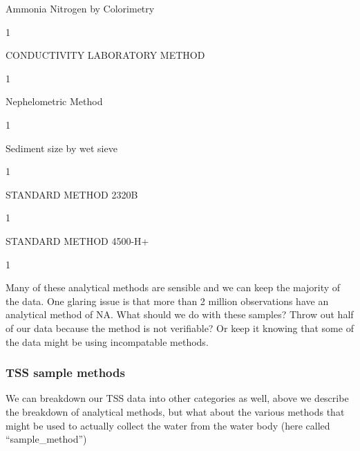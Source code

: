 \documentclass[]{article}
\newenvironment{Shaded}{\begin{snugshade}}{\end{snugshade}}
\newcommand{\DataTypeTok}[1]{\textcolor[rgb]{0.13,0.29,0.53}{#1}}
\newcommand{\KeywordTok}[1]{\textcolor[rgb]{0.13,0.29,0.53}{\textbf{#1}}}
\newcommand{\NormalTok}[1]{#1}
\newcommand{\OperatorTok}[1]{\textcolor[rgb]{0.81,0.36,0.00}{\textbf{#1}}}
\newcommand{\StringTok}[1]{\textcolor[rgb]{0.31,0.60,0.02}{#1}}
\begin{document}
Ammonia Nitrogen by Colorimetry

1

CONDUCTIVITY LABORATORY METHOD

1

Nephelometric Method

1

Sediment size by wet sieve

1

STANDARD METHOD 2320B

1

STANDARD METHOD 4500-H+

1

Many of these analytical methods are sensible and we can keep the
majority of the data. One glaring issue is that more than 2 million
observations have an analytical method of NA. What should we do with
these samples? Throw out half of our data because the method is not
verifiable? Or keep it knowing that some of the data might be using
incompatable methods.

\hypertarget{tss-sample-methods}{%
\subsubsection{TSS sample methods}\label{tss-sample-methods}}

We can breakdown our TSS data into other categories as well, above we
describe the breakdown of analytical methods, but what about the various
methods that might be used to actually collect the water from the water
body (here called ``sample\_method'')

\begin{Shaded}
\end{Shaded}
\end{document}
